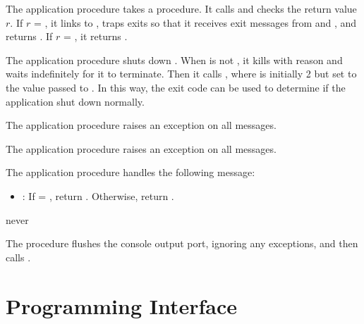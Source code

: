  The application  procedure
takes a  procedure. It calls  and
checks the return value $r$. If $r$ = ,
it links to , traps exits so that it receives exit
messages from  and , and
returns . If $r$ = , it returns .

 The application 
procedure shuts down . When  is not
, it kills  with reason  and
waits indefinitely for it to terminate. Then it calls
, where  is
initially 2 but set to the value passed to
. In this way, the exit code can be used
to determine if the application shut down normally.

 The application
 procedure raises an exception on all messages.

 The application
 procedure raises an exception on all messages.

 The application
 procedure handles the following message:\antipar

\begin{itemize}
\item {}: If  =
  , return . Otherwise,
  return .
\end{itemize}

\begin{procedure}
\end{procedure}
\returns{} never

The  procedure flushes the console output port,
ignoring any exceptions, and then calls .

\section {Programming Interface}

\begin{procedure}
\end{procedure}
\returns{} 

